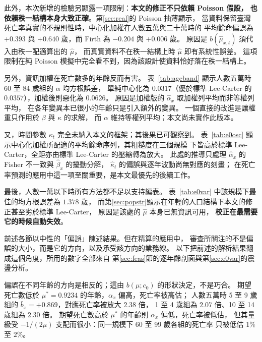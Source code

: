 \documentclass[UTF8, fontset=macnew, a4paper, 12pt]{ctexart}
\begin{document}
此外，本次新增的檢驗另顯露一項限制：\textbf{本文的修正不只依賴 Poisson 假設，
也依賴秩一結構本身大致正確}。第\ref{sec:real}的 Poisson 抽薄顯示，
當資料保留臺灣死亡率真實的不規則性時，中心化加權在人數五萬與二十萬時的
平均餘命偏誤為 $+0.393$ 與 $+0.640$ 歲，而 Firth 為 $-0.204$ 與 $+0.006$ 歲。
原因是 $b(\hat\mu_{x,t})$ 須代入由秩一配適算出的 $\hat\mu$，
而真實資料不在秩一結構上時 $\hat\mu$ 即有系統性誤差。
這項限制在純 Poisson 模擬中完全看不到，因為該設計使資料恰好落在秩一結構上。

另外，資訊加權在死亡數多的年齡反而有害。
表~\ref{tab:ageband} 顯示人數五萬時 $60$ 至 $84$ 歲組的 $\alpha$ 均方根誤差，
單純中心化為 $0.0317$（優於標準 Lee-Carter 的 $0.0357$），加權後則惡化為 $0.0626$。
原因是加權版的 $\hat\alpha_x$ 取加權列平均而非等權列平均，
在各年變異本已很小的年齡只是引入額外的變異。
一個直接的改進是讓權重只作用於 $\beta$ 與 $\kappa$ 的求解，
而 $\alpha$ 維持等權列平均；本文尚未實作此版本。

又，時間參數 $\kappa_t$ 完全未納入本文的框架；其後果已可觀察到。
表~\ref{tab:e0osc} 顯示中心化加權所配適的平均餘命序列，其粗糙度在三個規模
下皆高於標準 Lee-Carter，全距亦由標準 Lee-Carter 的壓縮轉為放大。
此處的推導只處理 $\hat\alpha_x$ 的 Fisher 不一致與 $\hat\beta_x$ 的擾動分解，
$\hat\kappa_t$ 的偏誤與逐年波動尚無對應的刻畫；
在死亡率預測的應用中這一項至關重要，是本文最優先的後續工作。

最後，人數一萬以下時所有方法都不足以支持編表。
表~\ref{tab:e0var} 中該規模下最佳的均方根誤差為 $1.378$ 歲，
而第\ref{sec:popstr}顯示在年輕的人口結構下本文的修正甚至劣於標準 Lee-Carter，
原因是該處的 $\hat\mu$ 本身已無資訊可用，
\textbf{校正在最需要它的時候自動失效}。



前述各節以中性的「偏誤」陳述結果。但在精算的應用中，
審查所關注的不是偏誤的大小，而是它的方向，以及承受該方向的業務線。
以下把前述的解析結果翻成這個角度，所用的數字全部來自
第\ref{sec:feas}節的逐年齡剖面與第\ref{sec:e0var}的震盪分析。

偏誤在不同年齡的方向是相反的；這由 $b(\mu;c_0)$ 的形狀決定，不是巧合。
期望死亡數低於 $\mu^{\ast}=0.9234$ 的年齡，$\alpha_x$ 偏高，死亡率被高估；
人數五萬時 5 至 9 歲組的 $\bar b_x=+0.869$，對應死亡率被放大 $2.38$ 倍，
1 至 4 歲組為 $2.07$ 倍、10 至 14 歲組為 $2.30$ 倍。
期望死亡數高於 $\mu^{\ast}$ 的年齡則 $\alpha_x$ 偏低，死亡率被低估，
但其量級受 $-1/(2\mu)$ 支配而很小：同一規模下 60 至 99 歲各組的死亡率
只被低估 $1\%$ 至 $2\%$。
\end{document}
